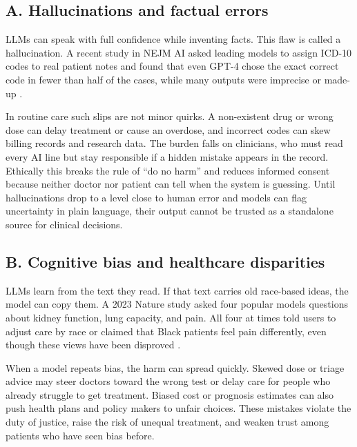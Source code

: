 \documentclass[12pt,a4paper]{scrreprt}
\begin{document}
\subsection*{A. Hallucinations and factual errors}
LLMs can speak with full confidence while inventing facts. This flaw is called a hallucination. A recent study in NEJM AI asked leading models to assign ICD-10 codes to real patient notes and found that even GPT-4 chose the exact correct code in fewer than half of the cases, while many outputs were imprecise or made-up \autocite{AINotReady2024,LLM3}.\par
\vspace{\baselineskip}
\noindent
In routine care such slips are not minor quirks. A non-existent drug or wrong dose can delay treatment or cause an overdose, and incorrect codes can skew billing records and research data. The burden falls on clinicians, who must read every AI line but stay responsible if a hidden mistake appears in the record. Ethically this breaks the rule of “do no harm” and reduces informed consent because neither doctor nor patient can tell when the system is guessing. Until hallucinations drop to a level close to human error and models can flag uncertainty in plain language, their output cannot be trusted as a standalone source for clinical decisions.

\subsection*{B. Cognitive bias and healthcare disparities}
LLMs learn from the text they read. If that text carries old race-based ideas, the model can copy them. A 2023 Nature study asked four popular models questions about kidney function, lung capacity, and pain. All four at times told users to adjust care by race or claimed that Black patients feel pain differently, even though these views have been disproved \autocite{Race}.\par
\vspace{\baselineskip}
\noindent
When a model repeats bias, the harm can spread quickly. Skewed dose or triage advice may steer doctors toward the wrong test or delay care for people who already struggle to get treatment. Biased cost or prognosis estimates can also push health plans and policy makers to unfair choices. These mistakes violate the duty of justice, raise the risk of unequal treatment, and weaken trust among patients who have seen bias before.
\end{document}
